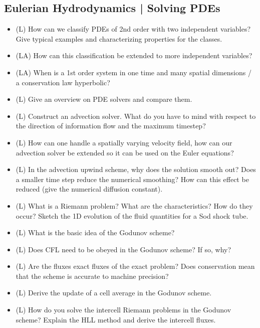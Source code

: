 \subsection*{Eulerian Hydrodynamics | Solving PDEs}

\begin{itemize}
    \item (L) How can we classify PDEs of 2nd order with two independent variables? Give typical examples and
    characterizing properties for the classes.
    \answerboxL
    \item (LA) How can this classification be extended to more independent variables?
    \answerboxM
    \item (LA) When is a 1st order system in one time and many spatial dimensions / a conservation law hyperbolic?
    \answerboxM
    \item (L) Give an overview on PDE solvers and compare them.
    \answerboxL
    \item (L) Construct an advection solver. What do you have to mind with respect to the 
    direction of information flow and the maximum timestep?
    \answerboxL
    \item (L) How can one handle a spatially varying velocity field, how can our advection solver
    be extended so it can be used on the Euler equations?
    \answerboxM
    \item (L) In the advection upwind scheme, why does the solution smooth out? Does a smaller
    time step reduce the numerical smoothing? How can this effect be reduced (give the numerical 
    diffusion constant).
    \answerboxL
    \item (L) What is a Riemann problem? What are the characteristics? How do they occur? Sketch the 1D evolution of the fluid quantities for a Sod shock tube.
    \answerboxL
    \item (L) What is the basic idea of the Godunov scheme?
    \answerboxM
    \item (L) Does CFL need to be obeyed in the Godunov scheme? If so, why?
    \answerboxS
    \item (L) Are the fluxes exact fluxes of the exact problem? Does conservation mean that the scheme is accurate to machine precision?
    \answerboxS
    \item (L) Derive the update of a cell average in the Godunov scheme.
    \answerboxL
    \item (L) How do you solve the intercell Riemann problems in the Godunov scheme? Explain the HLL method and derive the intercell fluxes.

\end{itemize}

